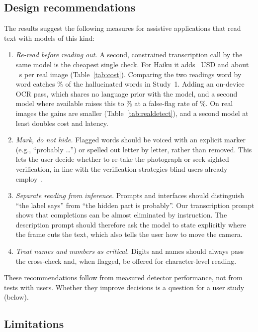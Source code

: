 \subsection{Design recommendations}

The results suggest the following measures for assistive applications that read text with models of this kind:
\begin{enumerate}
\item \emph{Re-read before reading out.} A second, constrained transcription call by the same model is the cheapest single check. For Haiku it adds \RealCostHaikuTrans{}~USD and about \RealCostHaikuTransSec{}~s per real image (Table~\ref{tab:cost}). Comparing the two readings word by word catches \RangeRereadRec\% of the hallucinated words in Study~1. Adding an on-device OCR pass, which shares no language prior with the model, and a second model where available raises this to \RangeRuleRec\% at a false-flag rate of \RangeRuleFf\%. On real images the gains are smaller (Table~\ref{tab:realdetect}), and a second model at least doubles cost and latency.
\item \emph{Mark, do not hide.} Flagged words should be voiced with an explicit marker (e.g., ``probably \ldots'') or spelled out letter by letter, rather than removed. This lets the user decide whether to re-take the photograph or seek sighted verification, in line with the verification strategies blind users already employ~\cite{alharbi2024misfitting,xie2025beyond}.
\item \emph{Separate reading from inference.} Prompts and interfaces should distinguish ``the label says'' from ``the hidden part is probably''. Our transcription prompt shows that completions can be almost eliminated by instruction. The description prompt should therefore ask the model to state explicitly where the frame cuts the text, which also tells the user how to move the camera.
\item \emph{Treat names and numbers as critical.} Digits and names should always pass the cross-check and, when flagged, be offered for character-level reading.
\end{enumerate}
These recommendations follow from measured detector performance, not from tests with users. Whether they improve decisions is a question for a user study (below).

\subsection{Limitations}

